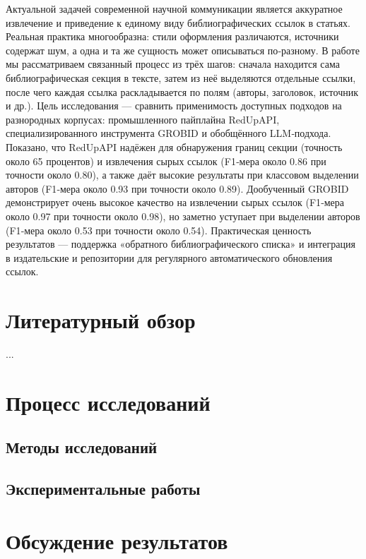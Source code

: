 \documentclass{mipt-thesis-ms}
\begin{document}
Актуальной задачей современной научной коммуникации является аккуратное извлечение и приведение к единому виду библиографических ссылок в статьях. Реальная практика многообразна: стили оформления различаются, источники содержат шум, а одна и та же сущность может описываться по‑разному. В работе мы рассматриваем связанный процесс из трёх шагов: сначала находится сама библиографическая секция в тексте, затем из неё выделяются отдельные ссылки, после чего каждая ссылка раскладывается по полям (авторы, заголовок, источник и др.). Цель исследования — сравнить применимость доступных подходов на разнородных корпусах: промышленного пайплайна RedUpAPI, специализированного инструмента GROBID и обобщённого LLM‑подхода. Показано, что RedUpAPI надёжен для обнаружения границ секции (точность около 65 процентов) и извлечения сырых ссылок (F1‑мера около 0.86 при точности около 0.80), а также даёт высокие результаты при классовом выделении авторов (F1‑мера около 0.93 при точности около 0.89). Дообученный GROBID демонстрирует очень высокое качество на извлечении сырых ссылок (F1‑мера около 0.97 при точности около 0.98), но заметно уступает при выделении авторов (F1‑мера около 0.53 при точности около 0.54). Практическая ценность результатов — поддержка «обратного библиографического списка» и интеграция в издательские и репозитории для регулярного автоматического обновления ссылок.

\chapter{Литературный обзор}

...

\chapter{Процесс исследований}

\section{Методы исследований}

\section{Экспериментальные работы}

\chapter{Обсуждение результатов}
\end{document}
